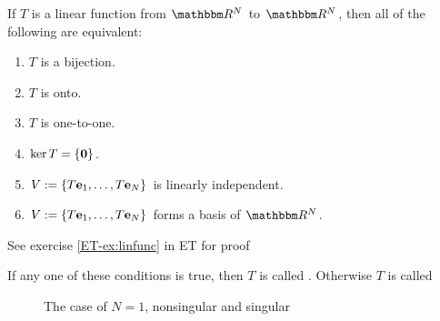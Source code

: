 \begin{frame}

    \vspace{2em}
    \Thm {\eqref{ET-t:linfunc}}
        If $T$ is a linear function from $\RR^N$ to $\RR^N$, then all of the
        following are equivalent:
        \begin{enumerate}
            \item $T$ is a bijection.
            \item $T$ is onto.
            \item $T$ is one-to-one.
            \item $\operatorname{ker} T = \{ {\mathbf 0} \}$.
            \item $V := \{T{\mathbf e}_1, \ldots, T{\mathbf e}_N\}$ is
                linearly independent.
            \item $V := \{T{\mathbf e}_1, \ldots, T{\mathbf e}_N\}$ forms a basis of
                $\RR^N$.
        \end{enumerate}
    See exercise \ref{ET-ex:linfunc} in ET for proof
    
    \vspace{.7em}
    If any one of these conditions is true, then $T$ is called
    . Otherwise $T$ is called 
    
\end{frame}

\begin{frame}

    \begin{figure}
       \begin{center}
        \caption{The case of $N=1$, nonsingular and singular}
       \end{center}
    \end{figure}
    
\end{frame}

